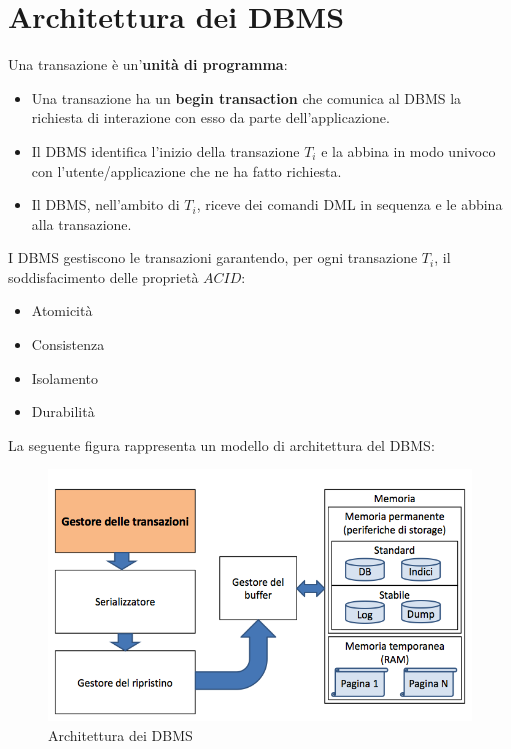 \chapter{Architettura dei DBMS}

Una transazione è un'\textbf{unità di programma}: 
    \begin{itemize}
        \item{Una transazione ha un \textbf{begin transaction} che comunica al DBMS la richiesta di interazione con esso da parte dell'applicazione.}
        \item{Il DBMS identifica l'inizio della transazione $T_i$ e la abbina in modo univoco con l'utente/applicazione che ne ha fatto richiesta.}
        \item{Il DBMS, nell'ambito di $T_i$, riceve dei comandi DML in sequenza e le abbina alla transazione.}
    \end{itemize}

I DBMS gestiscono le transazioni garantendo, per ogni transazione $T_i$, il soddisfacimento delle proprietà $ACID$:
    \begin{itemize}
        \item{Atomicità}
        \item{Consistenza}
        \item{Isolamento}
        \item{Durabilità}
    \end{itemize}

La seguente figura rappresenta un modello di architettura del DBMS:
    \begin{figure}[h!]
        \centering
        \includegraphics[scale = 0.45]{05/img01}
        \caption{Architettura dei DBMS}
    \end{figure}
    
